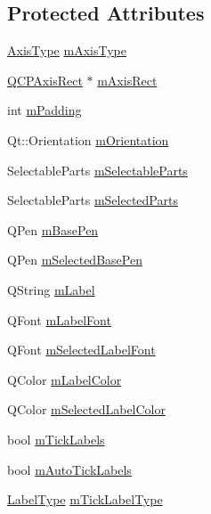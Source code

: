 \subsection*{Protected Attributes}
\begin{DoxyCompactItemize}
\item 
\hyperlink{class_q_c_p_axis_ae2bcc1728b382f10f064612b368bc18a}{Axis\+Type} \hyperlink{class_q_c_p_axis_ae704bf9f2c2b026f08dd4ccad79c616e}{m\+Axis\+Type}
\item 
\hyperlink{class_q_c_p_axis_rect}{Q\+C\+P\+Axis\+Rect} $\ast$ \hyperlink{class_q_c_p_axis_a6f150b65a202f32936997960e331dfcb}{m\+Axis\+Rect}
\item 
int \hyperlink{class_q_c_p_axis_a52a805a4f03231210e0880db7f77e098}{m\+Padding}
\item 
Qt\+::\+Orientation \hyperlink{class_q_c_p_axis_a048e1792fa86f4f86df55200b3f0be36}{m\+Orientation}
\item 
Selectable\+Parts \hyperlink{class_q_c_p_axis_ab9042d8a095998f27a28b39411d8b9c3}{m\+Selectable\+Parts}
\item 
Selectable\+Parts \hyperlink{class_q_c_p_axis_a8f1eb0abfe2ae64652aa46b360e841e4}{m\+Selected\+Parts}
\item 
Q\+Pen \hyperlink{class_q_c_p_axis_ad6b4a0aee9558fb35529e960b8fef72d}{m\+Base\+Pen}
\item 
Q\+Pen \hyperlink{class_q_c_p_axis_a80baa4e3c16f9b6edf3eccacd2a50fde}{m\+Selected\+Base\+Pen}
\item 
Q\+String \hyperlink{class_q_c_p_axis_ae8001dbdfc47685c1cf7b98b044460e6}{m\+Label}
\item 
Q\+Font \hyperlink{class_q_c_p_axis_a37442d470e30e19b81ecaf979a34d046}{m\+Label\+Font}
\item 
Q\+Font \hyperlink{class_q_c_p_axis_ae48fe3489afadc0b3cd003233e2bf19f}{m\+Selected\+Label\+Font}
\item 
Q\+Color \hyperlink{class_q_c_p_axis_a457a003bb1c2b6ab73e5a173ba7558fd}{m\+Label\+Color}
\item 
Q\+Color \hyperlink{class_q_c_p_axis_a94f57de3ba024471ca206d83cf2258dd}{m\+Selected\+Label\+Color}
\item 
bool \hyperlink{class_q_c_p_axis_a3e4315be072026644e69009557a2fa11}{m\+Tick\+Labels}
\item 
bool \hyperlink{class_q_c_p_axis_a721e496b342f272078c5ff84564e472f}{m\+Auto\+Tick\+Labels}
\item 
\hyperlink{class_q_c_p_axis_a4a7da0166f755f5abac23b765d184cad}{Label\+Type} \hyperlink{class_q_c_p_axis_a6e056c1cb1aab0eddebfebbcb78c8f90}{m\+Tick\+Label\+Type}

\end{DoxyCompactItemize}
